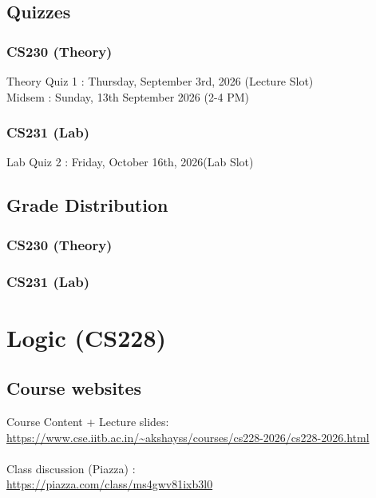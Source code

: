 \documentclass{article}
\begin{document}
        \subsection{Quizzes}

        \subsubsection{CS230 (Theory)}
        Theory Quiz 1 : Thursday, September 3rd, 2026 (Lecture Slot)\\
        Midsem : Sunday, 13th September 2026 (2-4 PM)

        \subsubsection{CS231 (Lab)}
        Lab Quiz 2 : Friday, October 16th, 2026(Lab Slot)\\

    \subsection{Grade Distribution}

        \subsubsection{CS230 (Theory)}

        \subsubsection{CS231 (Lab)}

\pagebreak


\section{Logic (CS228)}

    \subsection{Course websites}
    Course Content + Lecture slides: \\\url{https://www.cse.iitb.ac.in/~akshayss/courses/cs228-2026/cs228-2026.html}
    \\\\
    Class discussion (Piazza) : \\\url{https://piazza.com/class/ms4gwv81ixb3l0}
\end{document}
